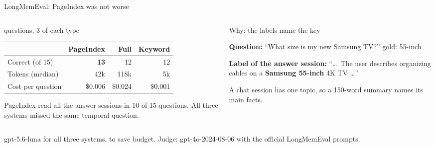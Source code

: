 \documentclass[aspectratio=169,11pt]{beamer}
\newcommand{\lbl}[1]{{\color{Mute}\fontsize{9.5}{12}\selectfont #1}\par}
\newcommand{\fnote}[1]{{\color{Mute}\fontsize{8.5}{11}\selectfont #1\par}}
\begin{document}
\begin{frame}{LongMemEval: PageIndex was not worse}
  \vspace{0.20cm}
  \begin{columns}[T,onlytextwidth]
    \begin{column}{0.53\textwidth}
      \lbl{15 questions, 3 of each type}
      \vspace{0.10cm}
      {\fontsize{9.5}{12.5}\selectfont\setlength{\tabcolsep}{4pt}
      \begin{tabular}{@{}lrrr@{}}
        \toprule
        & PageIndex & Full & Keyword \\
        \midrule
        Correct (of 15) & \textbf{13} & 12 & 12 \\
        Tokens (median) & 42k & 118k & 5k \\
        Cost per question & \$0.006 & \$0.024 & \$0.001 \\
        \bottomrule
      \end{tabular}\par}
      \vspace{0.25cm}
      {\fontsize{10}{13}\selectfont PageIndex read all the answer sessions in 10 of 15 questions. All three systems missed the same temporal question.\par}
    \end{column}
    \begin{column}{0.43\textwidth}
      \lbl{Why: the labels name the key}
      \vspace{0.10cm}
      {\setlength{\fboxsep}{7pt}\colorbox{Panel}{\parbox{0.93\linewidth}{\fontsize{10}{13.5}\selectfont
        \textbf{Question:} ``What size is my new Samsung TV?'' \hfill {\color{Mute}gold: 55-inch}\par
        \vspace{0.12cm}
        \textbf{Label of the answer session:} ``\dots\ The user describes organizing cables on a \textbf{Samsung 55-inch} 4K TV \dots''\par}}}\par
      \vspace{0.20cm}
      {\fontsize{10}{13}\selectfont A chat session has one topic, so a 150-word summary names its main facts.\par}
    \end{column}
  \end{columns}
  \vspace{0.25cm}
  \fnote{gpt-5.6-luna for all three systems, to save budget. Judge: gpt-4o-2024-08-06 with the official LongMemEval prompts.}
\end{frame}
\end{document}

